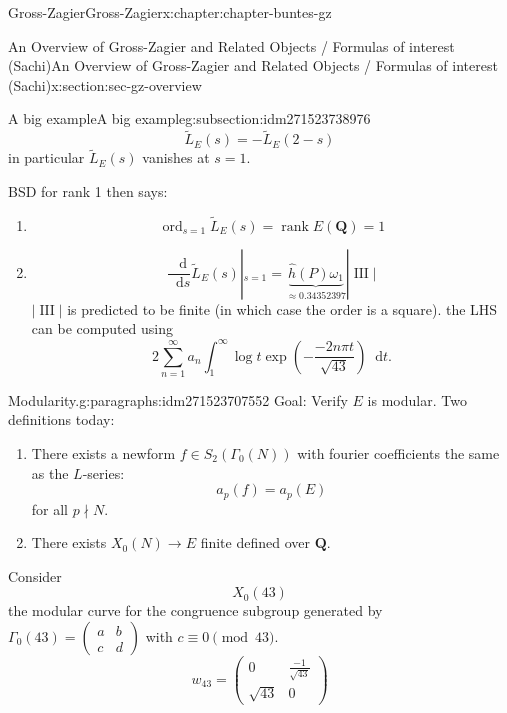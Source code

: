 \documentclass[oneside,10pt,]{book}
\numberwithin{equation}{section}
\newcommand{\diff}{\mathop{}\!\mathrm{d}}
\DeclareMathOperator{\Sha}{III}
\newcommand{\QQ}{\mathbf{Q}}
\DeclareMathOperator{\rank}{rank}
\DeclareMathOperator{\ord}{ord}
\newcommand{\amp}{&}
\begin{document}
\begin{chapterptx}{Gross-Zagier}{}{Gross-Zagier}{}{}{x:chapter:chapter-buntes-gz}
\begin{sectionptx}{An Overview of Gross-Zagier and Related Objects \slash{} Formulas of interest (Sachi)}{}{An Overview of Gross-Zagier and Related Objects \slash{} Formulas of interest (Sachi)}{}{}{x:section:sec-gz-overview}
\begin{subsectionptx}{A big example}{}{A big example}{}{}{g:subsection:idm271523738976}
\begin{equation*}
\widetilde L_E(s) = - \widetilde L_E(2-s)
\end{equation*}
in particular \(\widetilde L_E(s)\) vanishes at \(s=1\).%
\par
BSD for rank 1 then says:%
\begin{enumerate}
\item{}%
\begin{equation*}
\ord_{s=1} \widetilde L_E(s) = \rank E(\QQ) = 1
\end{equation*}
%
\item{}%
\begin{equation*}
\frac{\diff}{\diff s} \widetilde L_E(s)|_{s=1} = \underbrace{\hat h ( P) \omega _1}_{\approx 0.34352397} |\Sha|
\end{equation*}
\(|\Sha|\) is predicted to be finite (in which case the order is a square). the LHS can be computed using%
\begin{equation*}
2\sum_{n=1}^\infty  a_n \int_1^\infty  \log t \exp\left(- \frac{-2 n  \pi  t  }{\sqrt{43}}\right) \diff t\text{.}
\end{equation*}
%
\end{enumerate}
%
\begin{paragraphs}{Modularity.}{g:paragraphs:idm271523707552}%
Goal: Verify \(E\) is modular. Two definitions today:%
\begin{enumerate}
\item{}There exists a newform \(f \in S_2(\Gamma _0(N))\) with fourier coefficients the same as the \(L\)-series:%
\begin{equation*}
a_p(f) = a_p(E)
\end{equation*}
for all \(p\nmid N\).%
\item{}There exists \(X_0(N) \to E\) finite defined over \(\QQ\).%
\end{enumerate}
%
\par
Consider%
\begin{equation*}
X_0(43)
\end{equation*}
the modular curve for the congruence subgroup generated by \(\Gamma _0(43) = \begin{pmatrix} a \amp b \\ c \amp d \end{pmatrix}\) with \(c \equiv  0 \pmod{43}\).%
\begin{equation*}
w_{43} =  \begin{pmatrix} 0 \amp \frac{-1}{\sqrt{43}} \\ \sqrt{43} \amp 0\end{pmatrix}

\end{equation*}
\end{paragraphs}
\end{subsectionptx}
\end{sectionptx}
\end{chapterptx}
\end{document}
